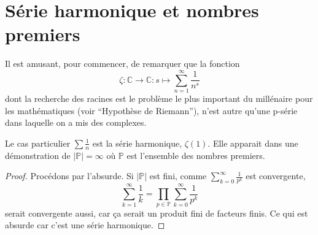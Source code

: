 \annexe
\section{Série harmonique et nombres premiers}
\label{ann:prime_harm}
Il est amusant, pour commencer, de remarquer que la fonction
\[ \zeta : \mathbb{C} \to \mathbb{C} :
s \mapsto \sum_{n=1}^\infty \frac{1}{n^s} \]
dont la recherche des racines est le problème le plus
important du millénaire pour les mathématiques (voir ``Hypothèse de Riemann''),
n'est autre qu'une p-série dans laquelle on a mis des complexes.

Le cas particulier $\sum \frac{1}{n}$ est la série harmonique, $\zeta(1)$.
Elle apparait dans une démonstration de $|\mathbb{P}| = \infty$
où $\mathbb{P}$ est l'ensemble des nombres premiers.
\begin{proof}
  Procédons par l'absurde.
  Si $|\mathbb{P}|$ est fini,
  comme $\sum_{k = 0}^{\infty}\frac{1}{p^k}$ est convergente,
  $$\sum_{k = 1}^{\infty}\frac{1}{k} = \prod_{p\in\mathbb{P}}\sum_{k = 0}^{\infty}\frac{1}{p^k}$$
  serait convergente aussi, car ça serait un produit fini de facteurs finis.
  Ce qui est absurde car c'est une série harmonique.
\end{proof}


